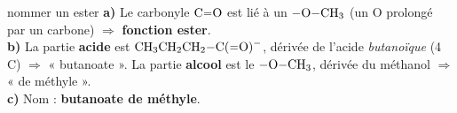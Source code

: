 \documentclass[11pt,a4paper]{article}
\newcommand{\rep}[1]{\textcolor{primarydark}{\textbf{#1}}}
\begin{document}
\begin{corr}{nommer un ester}
\textbf{a)} Le carbonyle $\ce{C=O}$ est lié à un $\ce{-O-CH3}$ (un O prolongé par un carbone) $\Rightarrow$ \rep{fonction ester}.\\
\textbf{b)} La partie \textbf{acide} est $\ce{CH3CH2CH2-C(=O)-}$, dérivée de l'acide \emph{butanoïque} (4 C) $\Rightarrow$ « butanoate ». La partie \textbf{alcool} est le $\ce{-O-CH3}$, dérivée du méthanol $\Rightarrow$ « de méthyle ».\\
\textbf{c)} Nom : \rep{butanoate de méthyle}.
\end{corr}
\end{document}
